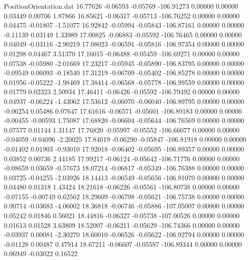 \begin{filecontents}{PositionOrientation.dat}
  16.77626   -0.06593   -0.05769  -106.91273    0.00000    0.00000    0.03449    0.00706    1.87866
  16.85621   -0.06317   -0.05713  -106.76252    0.00000    0.00000    0.04475   -0.01807   -1.51077
  16.92842   -0.05994   -0.05843  -106.87161    0.00000    0.00000   -0.11139    0.03149    1.33989
  17.00825   -0.06883   -0.05592  -106.76465    0.00000    0.00000    0.04049   -0.03116   -2.90219
  17.08023   -0.06591   -0.05816  -106.97354    0.00000    0.00000    0.01298    0.04467    3.51370
  17.16015   -0.06488   -0.05459  -106.69271    0.00000    0.00000    0.07538   -0.05980   -2.01669
  17.23217   -0.05945   -0.05890  -106.83795    0.00000    0.00000   -0.09549    0.06093   -0.18540
  17.31219   -0.06709   -0.05402  -106.85278    0.00000    0.00000    0.01956   -0.05222   -1.98469
  17.38414   -0.06568   -0.05778  -106.99559    0.00000    0.00000    0.01779    0.02323    2.50934
  17.46411   -0.06426   -0.05592  -106.79492    0.00000    0.00000    0.04937   -0.06224   -1.43062
  17.53612   -0.06070   -0.06040  -106.89795    0.00000    0.00000   -0.06254    0.05486    0.07647
  17.61616   -0.06571   -0.05601  -106.89183    0.00000    0.00000   -0.00455   -0.00593    1.75087
  17.68820   -0.06604   -0.05644  -106.76569    0.00000    0.00000    0.07577    0.01144    1.31147
  17.76820   -0.05997   -0.05552  -106.66077    0.00000    0.00000   -0.04059   -0.04096   -2.20025
  17.84019   -0.06290   -0.05847  -106.81918    0.00000    0.00000   -0.01402    0.01903   -0.93010
  17.92018   -0.06402   -0.05695  -106.89357    0.00000    0.00000    0.03852    0.00736    2.44185
  17.99217   -0.06124   -0.05642  -106.71776    0.00000    0.00000   -0.08659    0.03659   -0.57673
  18.07214   -0.06817   -0.05349  -106.76388    0.00000    0.00000    0.03725   -0.04255   -2.03926
  18.14413   -0.06549   -0.05656  -106.91070    0.00000    0.00000    0.04480    0.01318    1.43424
  18.21618   -0.06226   -0.05561  -106.80738    0.00000    0.00000   -0.07155   -0.00749    0.62562
  18.29609   -0.06798   -0.05621  -106.75738    0.00000    0.00000    0.00714   -0.03683   -4.06002
  18.36818   -0.06746   -0.05886  -107.05007    0.00000    0.00000    0.05242    0.01846    0.56021
  18.44816   -0.06327   -0.05738  -107.00526    0.00000    0.00000    0.01613    0.01528    3.63809
  18.52007   -0.06211   -0.05629  -106.74366    0.00000    0.00000   -0.03937    0.00081   -2.30270
  18.60010   -0.06526   -0.05622  -106.92794    0.00000    0.00000   -0.01128    0.00487    0.47914
  18.67211   -0.06607   -0.05587  -106.89344    0.00000    0.00000    0.06949   -0.03022    0.16522

\end{filecontents}
